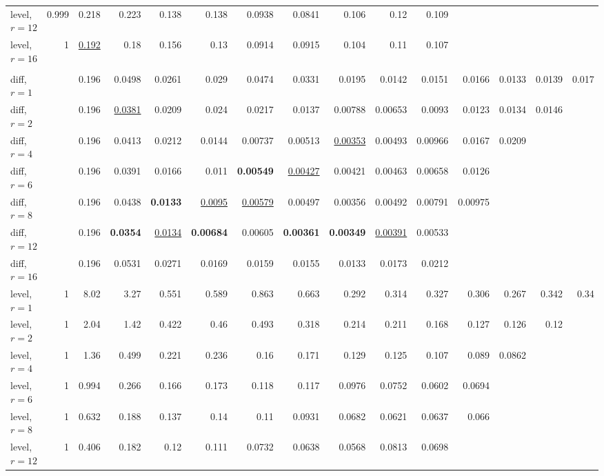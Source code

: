 \begin{table}[t]
\begin{tabular}{lrrrrrrrrrrrrrr}
\quad level, $r{=}12$ & 0.999 & 0.218 & 0.223 & 0.138 & 0.138 & 0.0938 & 0.0841 & 0.106 & 0.12 & 0.109 &  &  &  &  \\
\quad level, $r{=}16$ & 1 & \underline{0.192} & 0.18 & 0.156 & 0.13 & 0.0914 & 0.0915 & 0.104 & 0.11 & 0.107 &  &  &  &  \\
\addlinespace
\multicolumn{15}{l}{\textit{Chronos-2 L-syn}} \\
\quad diff, $r{=}1$ &  & 0.196 & 0.0498 & 0.0261 & 0.029 & 0.0474 & 0.0331 & 0.0195 & 0.0142 & 0.0151 & 0.0166 & 0.0133 & 0.0139 & 0.017 \\
\quad diff, $r{=}2$ &  & 0.196 & \underline{0.0381} & 0.0209 & 0.024 & 0.0217 & 0.0137 & 0.00788 & 0.00653 & 0.0093 & 0.0123 & 0.0134 & 0.0146 &  \\
\quad diff, $r{=}4$ &  & 0.196 & 0.0413 & 0.0212 & 0.0144 & 0.00737 & 0.00513 & \underline{0.00353} & 0.00493 & 0.00966 & 0.0167 & 0.0209 &  &  \\
\quad diff, $r{=}6$ &  & 0.196 & 0.0391 & 0.0166 & 0.011 & \textbf{0.00549} & \underline{0.00427} & 0.00421 & 0.00463 & 0.00658 & 0.0126 &  &  &  \\
\quad diff, $r{=}8$ &  & 0.196 & 0.0438 & \textbf{0.0133} & \underline{0.0095} & \underline{0.00579} & 0.00497 & 0.00356 & 0.00492 & 0.00791 & 0.00975 &  &  &  \\
\quad diff, $r{=}12$ &  & 0.196 & \textbf{0.0354} & \underline{0.0134} & \textbf{0.00684} & 0.00605 & \textbf{0.00361} & \textbf{0.00349} & \underline{0.00391} & 0.00533 &  &  &  &  \\
\quad diff, $r{=}16$ &  & 0.196 & 0.0531 & 0.0271 & 0.0169 & 0.0159 & 0.0155 & 0.0133 & 0.0173 & 0.0212 &  &  &  &  \\
\quad level, $r{=}1$ & 1 & 8.02 & 3.27 & 0.551 & 0.589 & 0.863 & 0.663 & 0.292 & 0.314 & 0.327 & 0.306 & 0.267 & 0.342 & 0.34 \\
\quad level, $r{=}2$ & 1 & 2.04 & 1.42 & 0.422 & 0.46 & 0.493 & 0.318 & 0.214 & 0.211 & 0.168 & 0.127 & 0.126 & 0.12 &  \\
\quad level, $r{=}4$ & 1 & 1.36 & 0.499 & 0.221 & 0.236 & 0.16 & 0.171 & 0.129 & 0.125 & 0.107 & 0.089 & 0.0862 &  &  \\
\quad level, $r{=}6$ & 1 & 0.994 & 0.266 & 0.166 & 0.173 & 0.118 & 0.117 & 0.0976 & 0.0752 & 0.0602 & 0.0694 &  &  &  \\
\quad level, $r{=}8$ & 1 & 0.632 & 0.188 & 0.137 & 0.14 & 0.11 & 0.0931 & 0.0682 & 0.0621 & 0.0637 & 0.066 &  &  &  \\
\quad level, $r{=}12$ & 1 & 0.406 & 0.182 & 0.12 & 0.111 & 0.0732 & 0.0638 & 0.0568 & 0.0813 & 0.0698 &  &  &  &  \\

\end{tabular}
\end{table}
